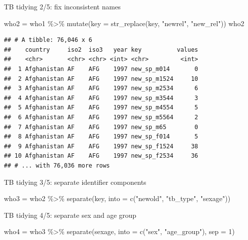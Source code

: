 \documentclass[
  ignorenonframetext,
]{beamer}
\newenvironment{Shaded}{\begin{snugshade}}{\end{snugshade}}
\newcommand{\AttributeTok}[1]{\textcolor[rgb]{0.77,0.63,0.00}{#1}}
\newcommand{\DecValTok}[1]{\textcolor[rgb]{0.00,0.00,0.81}{#1}}
\newcommand{\FunctionTok}[1]{\textcolor[rgb]{0.00,0.00,0.00}{#1}}
\newcommand{\NormalTok}[1]{#1}
\newcommand{\OtherTok}[1]{\textcolor[rgb]{0.56,0.35,0.01}{#1}}
\newcommand{\SpecialCharTok}[1]{\textcolor[rgb]{0.00,0.00,0.00}{#1}}
\newcommand{\StringTok}[1]{\textcolor[rgb]{0.31,0.60,0.02}{#1}}
\begin{document}
\begin{frame}[fragile]{TB tidying 2/5: fix inconsistent names}
\protect\hypertarget{tb-tidying-25-fix-inconsistent-names}{}
\begin{Shaded}
\begin{Highlighting}[]
\NormalTok{who2 }\OtherTok{=}\NormalTok{ who1 }\SpecialCharTok{\%\textgreater{}\%} 
  \FunctionTok{mutate}\NormalTok{(}\AttributeTok{key =} \FunctionTok{str\_replace}\NormalTok{(key, }\StringTok{"newrel"}\NormalTok{, }\StringTok{"new\_rel"}\NormalTok{))}
\NormalTok{who2}
\end{Highlighting}
\end{Shaded}

\begin{verbatim}
## # A tibble: 76,046 x 6
##    country     iso2  iso3   year key          values
##    <chr>       <chr> <chr> <int> <chr>         <int>
##  1 Afghanistan AF    AFG    1997 new_sp_m014       0
##  2 Afghanistan AF    AFG    1997 new_sp_m1524     10
##  3 Afghanistan AF    AFG    1997 new_sp_m2534      6
##  4 Afghanistan AF    AFG    1997 new_sp_m3544      3
##  5 Afghanistan AF    AFG    1997 new_sp_m4554      5
##  6 Afghanistan AF    AFG    1997 new_sp_m5564      2
##  7 Afghanistan AF    AFG    1997 new_sp_m65        0
##  8 Afghanistan AF    AFG    1997 new_sp_f014       5
##  9 Afghanistan AF    AFG    1997 new_sp_f1524     38
## 10 Afghanistan AF    AFG    1997 new_sp_f2534     36
## # ... with 76,036 more rows
\end{verbatim}
\end{frame}

\begin{frame}[fragile]{TB tidying 3/5: separate identifier components}
\protect\hypertarget{tb-tidying-35-separate-identifier-components}{}
\begin{Shaded}
\begin{Highlighting}[]
\NormalTok{who3 }\OtherTok{=}\NormalTok{ who2 }\SpecialCharTok{\%\textgreater{}\%} 
  \FunctionTok{separate}\NormalTok{(key, }\AttributeTok{into =} \FunctionTok{c}\NormalTok{(}\StringTok{"newold"}\NormalTok{, }\StringTok{"tb\_type"}\NormalTok{, }\StringTok{"sexage"}\NormalTok{))}
\end{Highlighting}
\end{Shaded}
\end{frame}

\begin{frame}[fragile]{TB tidying 4/5: separate sex and age group}
\protect\hypertarget{tb-tidying-45-separate-sex-and-age-group}{}
\begin{Shaded}
\begin{Highlighting}[]
\NormalTok{who4 }\OtherTok{=}\NormalTok{ who3 }\SpecialCharTok{\%\textgreater{}\%} 
  \FunctionTok{separate}\NormalTok{(sexage, }\AttributeTok{into =} \FunctionTok{c}\NormalTok{(}\StringTok{"sex"}\NormalTok{, }\StringTok{"age\_group"}\NormalTok{), }\AttributeTok{sep =} \DecValTok{1}\NormalTok{)}
\end{Highlighting}
\end{Shaded}
\end{frame}
\end{document}
